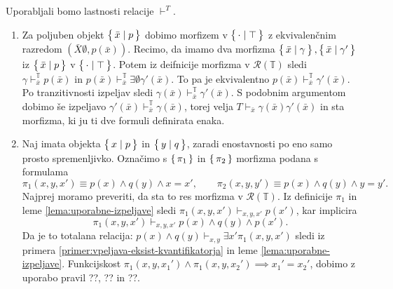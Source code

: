 \documentclass[../kategoricna_logika.tex]{subfiles}
\begin{document}
\begin{dokaz}
  Uporabljali bomo lastnosti relacije $\vdash^T$.
  \begin{enumerate}[label=(\roman*)]
  \item Za poljuben objekt $\left\lbrace\,\bar{x} \mid p\,\right\rbrace$ dobimo morfizem v $\left\lbrace\,\cdot \mid \top\,\right\rbrace$
    z ekvivalenčnim razredom $(\bar{X}\emptyset, p(\bar{x}))$.
    Recimo, da imamo dva morfizma $\left\lbrace\,\bar{x} \mid \gamma\,\right\rbrace, \left\lbrace\,\bar{x} \mid \gamma'\,\right\rbrace$
    iz $\left\lbrace\,\bar{x} \mid p\,\right\rbrace$ v $\left\lbrace\,\cdot \mid \top\,\right\rbrace$.
    Potem iz deifnicije morfizma v $\mathcal{R}(\mathbb{T})$ sledi
    $\gamma \vdash_{\bar{x}}^{\mathbb{T}} p(\bar{x})$ in
    $p(\bar{x}) \vdash_{\bar{x}}^{\mathbb{T}} \exists \emptyset \gamma'(\bar{x})$.
    To pa je ekvivalentno $p(\bar{x}) \vdash_{\bar{x}}^{\mathbb{T}} \gamma'(\bar{x})$.
    Po tranzitivnosti izpeljav sledi $\gamma(\bar{x}) \vdash_{\bar{x}}^{\mathbb{T}} \gamma'(\bar{x})$.
    S podobnim argumentom dobimo še izpeljavo $\gamma'(\bar{x}) \vdash_{\bar{x}}^{\mathbb{T}} \gamma(\bar{x}) $,
    torej velja $T \vdash_{\bar{x}} \gamma(\bar{x}) \gamma'(\bar{x})$
    in sta morfizma, ki ju ti dve formuli definirata enaka.
    
  \item Naj imata objekta $\left\lbrace\,x \mid p\,\right\rbrace$ in $\left\lbrace\,y \mid q\,\right\rbrace$, zaradi
    enostavnosti po eno samo prosto spremenljivko.  Označimo s
    $\left\lbrace\,\pi_1\,\right\rbrace$ in $\left\lbrace\,\pi_2\,\right\rbrace$ morfizma podana s formulama
    \[ \pi_1(x,y,x') \equiv p(x) \land q(y) \land x=x', \qquad
      \pi_2(x,y,y') \equiv p(x) \land q(y) \land y=y'.
    \]
    Najprej moramo preveriti, da sta to res morfizma v
    $\mathcal{R}(\mathbb{T})$.  Iz definicije $\pi_1$ in leme
    \ref{lema:uporabne-izpeljave} sledi
    $\pi_1(x,y,x') \vdash_{x,y,x'} p(x')$, kar implicira
    $$\pi_1(x,y,x') \vdash_{x,y,x'} p(x) \land q(y) \land p(x').$$
    Da je to totalana relacija:
    $p(x) \land q(y) \vdash_{x,y} \exists x' \pi_1(x,y,x')$ sledi iz
    primera \ref{primer:vpeljava-eksist-kvantifikatorja} in leme
    \ref{lema:uporabne-izpeljave}.  Funkcijskost
    $\pi_1(x,y,x_1') \land \pi_1(x,y,x_2') \implies x_1' = x_2'$,
    dobimo z uporabo pravil ??, ?? in ??.


\end{enumerate}
\end{dokaz}
\end{document}

